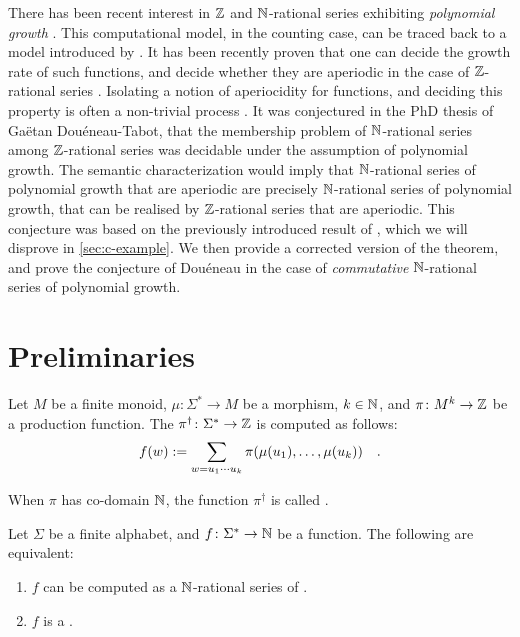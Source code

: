 \documentclass[a4paper,11pt]{article}
\begin{document}
There has been recent interest in $\mathbb{Z}$ and $\mathbb{N}$-rational series exhibiting
\emph{polynomial growth} \cite{doueneau2021pebble,bojanczyk2022transducers}.
This computational model, in the counting case, can be traced back to a model
introduced by \textcite{schutzenberger1965finite}. It has been recently proven
that one can decide the growth rate of such functions, and decide whether they
are aperiodic in the case of $\mathbb{Z}$-rational series \cite{LOPEZ23b}. Isolating
a notion of aperiocidity for functions, and deciding this property is often a
non-trivial process \cite{droste2019aperiodic}. It was conjectured in the PhD
thesis of Gaëtan Douéneau-Tabot, that the membership problem of $\mathbb{N}$-rational
series among $\mathbb{Z}$-rational series was decidable under the assumption of
polynomial growth. The semantic characterization would imply that
$\mathbb{N}$-rational series of polynomial growth that are aperiodic are precisely
$\mathbb{N}$-rational series of polynomial growth, that can be realised by
$\mathbb{Z}$-rational series that are aperiodic. This conjecture was based on the
previously introduced result of \textcite[Theorem 3.3]{KARH77}, which we will
disprove in \cref{sec:c-example}. 
We then provide a corrected version of the theorem, and prove the conjecture
of Douéneau in the case of \emph{commutative} $\mathbb{N}$-rational series of
polynomial growth.

\section{Preliminaries}


\begin{definition}
    Let $M$ be a finite monoid, $\mu \colon \Sigma^* \to M$
    be a morphism, $k \in \mathbb{N}$, and 
    $\pi \colon M^k \to \mathbb{Z}$ be a production function.
    The 
    $\pi^\dagger \colon \Sigma^* \to \mathbb{Z}$
    is computed as follows:
    \begin{equation*}
        f(w) \mathrel{:=}
        \sum_{w = u_1 \cdots u_k} \pi(\mu(u_1), \dots, \mu(u_k))
        \quad .
    \end{equation*}

    When $\pi$ has co-domain $\mathbb{N}$, the function $\pi^\dagger$
    is called .
\end{definition}



\begin{fact}
    \label{polynomial-rational-polyreg:fact}
    Let $\Sigma$ be a finite alphabet, and $f \colon \Sigma^* \to \mathbb{N}$
    be a function. The following are equivalent:
    \begin{enumerate}
        \item $f$ can be computed as a \k{$\mathbb{N}$-rational series}
            of .
        \item $f$ is a .
    \end{enumerate}
\end{fact}
\end{document}
